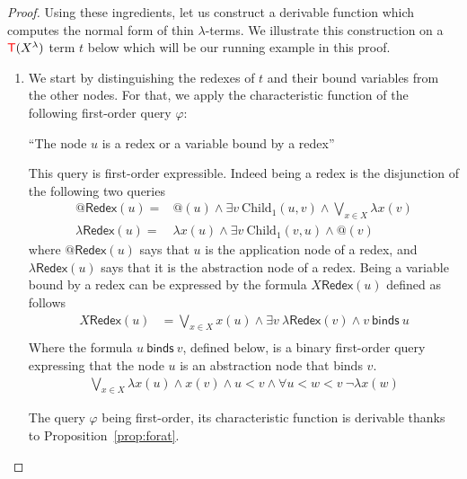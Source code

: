\begin{proof}
Using these ingredients, let us construct a derivable function which computes the normal form of thin $\lambda$-terms. We illustrate this construction on a ${\color{red}{\mathsf T}}(X^\lambda)$ term $t$ below which will be our running example in this proof. 

%   
\begin{enumerate}
\item
We start by distinguishing the redexes of $t$ and their bound variables from the other nodes. For that, we apply the characteristic function of the following first-order query $\varphi$:
    \begin{center}
    ``The node $u$ is a redex or a variable bound by a redex''
    \end{center}
    This query is first-order expressible. Indeed being a redex is the disjunction of the following two queries
$$\begin{array}{rl}
@\mathsf{Redex}(u) = & @(u) \wedge \exists v \ \mathrm{Child}_1(u,v) \wedge \bigvee_{x\in X}\lambda x(v)\\
\lambda\mathsf{Redex}(u)=& \lambda x(u) \wedge \exists v \ \mathrm{Child}_1(v,u) \wedge @(v) 
\end{array}$$
where $@\mathsf{Redex}(u)$ says that $u$ is the application node of a redex, and $\lambda\mathsf{Redex}(u)$ says that it is the abstraction node of a redex. Being a variable bound by a redex can be expressed by the formula $X\mathsf{Redex}(u)$ defined as follows
\begin{align*}
X\mathsf{Redex}(u)&=\bigvee_{x\in X} x(u) \wedge \exists v\ \lambda\mathsf{Redex}(v) \wedge v\ \mathsf{binds}\ u\\
\end{align*}
Where the formula $u\ \mathsf{binds}\ v$, defined below,  is a binary first-order query expressing that the node $u$ is an abstraction node that binds $v$.
 \begin{align*}
 \bigvee_{x\in X} \lambda x(u) \wedge x(v) \wedge u<v\wedge \forall u<w<v\ \neg \lambda x(w)
 \end{align*}

The query $\varphi$ being first-order, its characteristic function is derivable thanks to Proposition~\ref{prop:forat}. 


\end{enumerate}
\end{proof}
